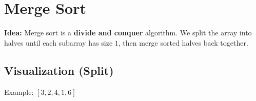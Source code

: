 \section{Merge Sort}

\textbf{Idea:} Merge sort is a \textbf{divide and conquer} algorithm.  
We split the array into halves until each subarray has size $1$, then merge sorted halves back together.

\subsection{Visualization (Split)}
Example: \([3,2,4,1,6]\)

